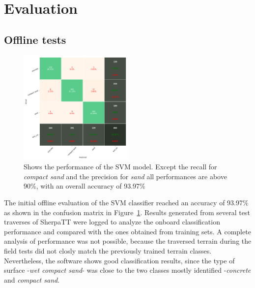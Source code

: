 \documentclass{article}
\begin{document}


\section{Evaluation}
\subsection{Offline tests}


\begin{figure}[h]
\centering
\includegraphics[width=0.5\textwidth]{../figures/confusionmatrix_Train.png}
\caption{\label{fig:confusionmatrix} Shows the performance of the SVM model. Except the recall for \emph{compact sand} and the precision for \emph{sand} all performances are above 90\%, with an overall accuracy of 93.97\%}
\end{figure}


The initial offline evaluation of the SVM classifier reached an accuracy of 93.97\% as shown in the confusion matrix in Figure~\ref{fig:confusionmatrix}.
Results generated from several test traverses of SherpaTT were logged to analyze the onboard classification performance and compared with the ones obtained from training sets. A complete analysis of performance was not possible, because the traversed terrain during the field tests did not closly match the previously trained terrain classes. Nevertheless, the software shows good classification results, since the type of surface -\emph{wet compact sand}- was close to the two classes mostly identified -\emph{concrete} and \emph{compact sand}.
\end{document}
